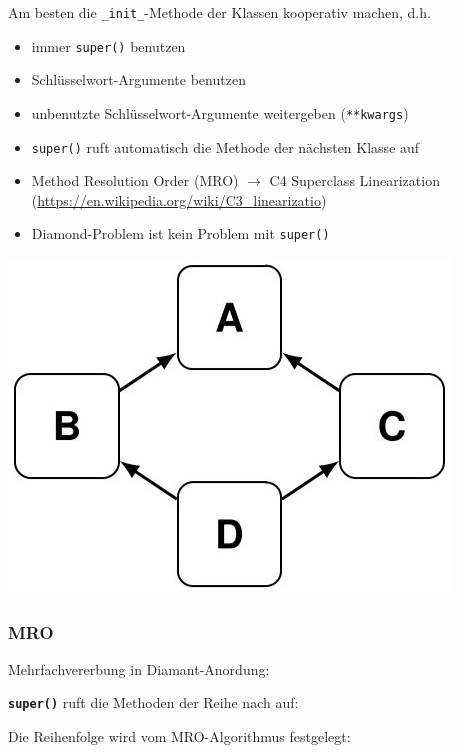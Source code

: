 \begin{minipage}[t]{0.49\textwidth}
	Am besten die \texttt{\_init\_\(\)}-Methode der Klassen kooperativ machen, d.h.
	\begin{itemize}
		\item immer \texttt{super()} benutzen
		\item Schlüsselwort-Argumente benutzen
		\item unbenutzte Schlüsselwort-Argumente weitergeben (\texttt{**kwargs})
		\item \texttt{super()} ruft automatisch die Methode der nächsten Klasse auf
		\item Method Resolution Order (MRO) $\rightarrow$ C4 Superclass Linearization (\url{https://en.wikipedia.org/wiki/C3_linearizatio})
		\item Diamond-Problem ist kein Problem mit \texttt{super()}
	\end{itemize}
\includegraphics[width=0.5\linewidth]{images/v7_vererbung3}
\end{minipage}
\hspace{0.02\textwidth}
\begin{minipage}[t]{0.49\textwidth}
	
\end{minipage}


\subsubsection{MRO}
\begin{minipage}[t]{0.49\textwidth}
	Mehrfachvererbung in Diamant-Anordung:
	
\end{minipage}
\hspace{0.02\textwidth}
\begin{minipage}[t]{0.49\textwidth}
	\texttt{\textbf{super()}} ruft die Methoden der Reihe nach auf:
	
	Die Reihenfolge wird vom MRO-Algorithmus festgelegt:
	
\end{minipage}

